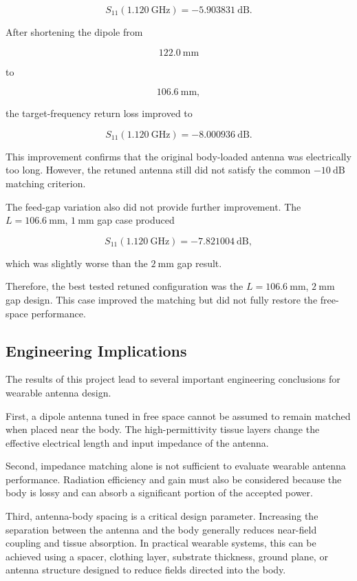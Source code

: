 \[
S_{11}(1.120~\mathrm{GHz}) = -5.903831~\mathrm{dB}.
\]

After shortening the dipole from

\[
122.0~\mathrm{mm}
\]

to

\[
106.6~\mathrm{mm},
\]

the target-frequency return loss improved to

\[
S_{11}(1.120~\mathrm{GHz}) = -8.000936~\mathrm{dB}.
\]

This improvement confirms that the original body-loaded antenna was electrically too long. However, the retuned antenna still did not satisfy the common \(-10~\mathrm{dB}\) matching criterion.

The feed-gap variation also did not provide further improvement. The \(L=106.6~\mathrm{mm}\), \(1~\mathrm{mm}\) gap case produced

\[
S_{11}(1.120~\mathrm{GHz}) = -7.821004~\mathrm{dB},
\]

which was slightly worse than the \(2~\mathrm{mm}\) gap result.

Therefore, the best tested retuned configuration was the \(L=106.6~\mathrm{mm}\), \(2~\mathrm{mm}\) gap design. This case improved the matching but did not fully restore the free-space performance.

\subsection{Engineering Implications}

The results of this project lead to several important engineering conclusions for wearable antenna design.

First, a dipole antenna tuned in free space cannot be assumed to remain matched when placed near the body. The high-permittivity tissue layers change the effective electrical length and input impedance of the antenna.

Second, impedance matching alone is not sufficient to evaluate wearable antenna performance. Radiation efficiency and gain must also be considered because the body is lossy and can absorb a significant portion of the accepted power.

Third, antenna-body spacing is a critical design parameter. Increasing the separation between the antenna and the body generally reduces near-field coupling and tissue absorption. In practical wearable systems, this can be achieved using a spacer, clothing layer, substrate thickness, ground plane, or antenna structure designed to reduce fields directed into the body.

